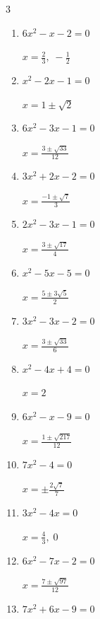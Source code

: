 \begin{multicols}{3}
\begin{enumerate}
        $\displaystyle x=1, \; -\frac{7}{9}$

  \item $6x^{2}-x-2=0$

        $\displaystyle x=\frac{2}{3}, \; -\frac{1}{2}$

  \item $x^{2}-2x-1=0$

        $\displaystyle x=1\pm \sqrt{2}$

  \item $6x^{2}-3x-1=0$

        $\displaystyle x=\frac{3\pm \sqrt{33}}{12}$

\columnbreak %

\resetques

  \item $3x^{2}+2x-2=0$

        $\displaystyle x=\frac{-1\pm \sqrt{7}}{3}$

  \item $2x^{2}-3x-1=0$

        $\displaystyle x=\frac{3\pm \sqrt{17}}{4}$

  \item $x^{2}-5x-5=0$

        $\displaystyle x=\frac{5\pm 3\sqrt{5}}{2}$

  \item $3x^{2}-3x-2=0$

        $\displaystyle x=\frac{3\pm \sqrt{33}}{6}$

  \item $x^{2}-4x+4=0$

        $\displaystyle x=2$

  \item $6x^{2}-x-9=0$

        $\displaystyle x=\frac{1\pm \sqrt{217}}{12}$

  \item $7x^{2}-4=0$

        $\displaystyle x=\pm \frac{2\sqrt{7}}{7}$

\columnbreak %

  \item $3x^{2}-4x=0$

        $\displaystyle x=\frac{4}{3}, \; 0$

  \item $6x^{2}-7x-2=0$

        $\displaystyle x=\frac{7\pm \sqrt{97}}{12}$

  \item $7x^{2}+6x-9=0$


\end{enumerate}
\end{multicols}
